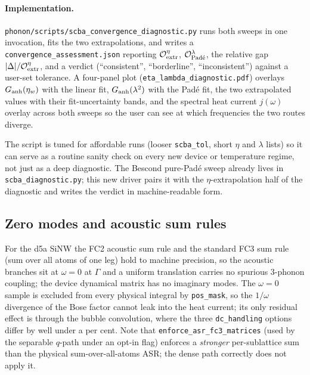 \paragraph{Implementation.}
\texttt{phonon/scripts/scba\_convergence\_diagnostic.py} runs both
sweeps in one invocation, fits the two extrapolations, and writes a
\texttt{convergence\_assessment.json} reporting
$\mathcal{O}^{\eta}_{\rm extr}$, $\mathcal{O}^{\lambda}_{\rm Pad\acute{e}}$,
the relative gap
$|\Delta|/\mathcal{O}^{\eta}_{\rm extr}$, and a verdict
(``consistent'', ``borderline'', ``inconsistent'') against a
user-set tolerance. A four-panel plot
(\texttt{eta\_lambda\_diagnostic.pdf}) overlays $G_{\rm anh}(\eta_{w})$
with the linear fit, $G_{\rm anh}(\lambda^{2})$ with the Pad\'e fit,
the two extrapolated values with their fit-uncertainty bands, and
the spectral heat current $j(\omega)$ overlay across both sweeps so
the user can see at which frequencies the two routes diverge.

The script is tuned for affordable runs (looser \texttt{scba\_tol},
short $\eta$ and $\lambda$ lists) so it can serve as a routine
sanity check on every new device or temperature regime, not just as a
deep diagnostic. The Bescond pure-Pad\'e sweep already lives in
\texttt{scba\_diagnostic.py}; this new driver pairs it with the
$\eta$-extrapolation half of the diagnostic and writes the verdict in
machine-readable form.

\subsection{Zero modes and acoustic sum rules}

For the d5a SiNW the FC2 acoustic sum rule and the standard FC3 sum
rule (sum over all atoms of one leg) hold to machine precision, so the
acoustic branches sit at $\omega=0$ at $\Gamma$ and a uniform
translation carries no spurious 3-phonon coupling; the device
dynamical matrix has no imaginary modes. The $\omega=0$ sample is
excluded from every physical integral by \texttt{pos\_mask}, so the
$1/\omega$ divergence of the Bose factor cannot leak into the heat
current; its only residual effect is through the bubble convolution,
where the three \texttt{dc\_handling} options differ by well under a
per cent. Note that \texttt{enforce\_asr\_fc3\_matrices} (used by the
separable $q$-path under an opt-in flag) enforces a \emph{stronger}
per-sublattice sum than the physical sum-over-all-atoms ASR; the dense
path correctly does not apply it.

